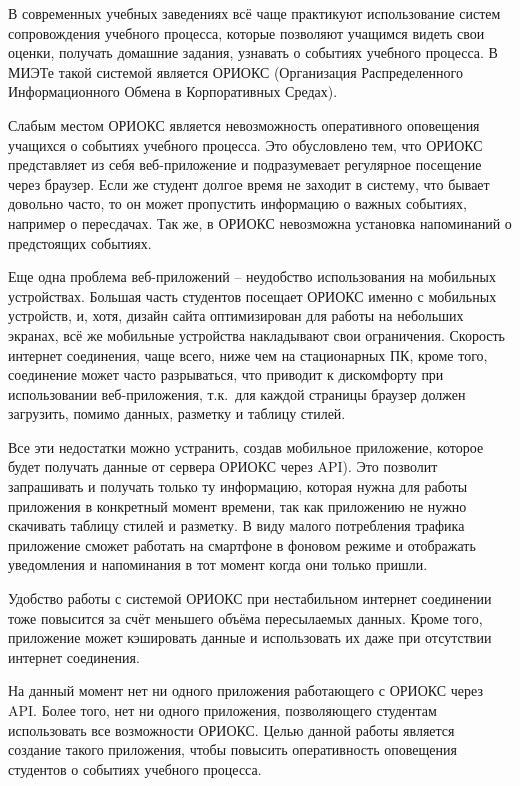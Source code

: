 \Introduction
{}
В современных учебных заведениях всё чаще практикуют использование систем сопровождения учебного процесса, которые позволяют учащимся видеть свои оценки, получать домашние задания, узнавать о событиях учебного процесса.
В МИЭТе такой системой является ОРИОКС (Организация Распределенного Информационного Обмена в Корпоративных Средах).

Слабым местом ОРИОКС является невозможность оперативного оповещения учащихся о событиях учебного процесса.
Это обусловлено тем, что ОРИОКС представляет из себя веб-приложение и подразумевает регулярное посещение через браузер.
Если же студент долгое время не заходит в систему, что бывает довольно часто, то он может пропустить информацию о важных событиях, например о пересдачах.
Так же, в ОРИОКС невозможна установка напоминаний о предстоящих событиях.

Еще одна проблема веб-приложений – неудобство использования на мобильных
устройствах.
Большая часть студентов посещает ОРИОКС именно с мобильных
устройств, и, хотя, дизайн сайта оптимизирован для работы на небольших экранах, всё же мобильные устройства накладывают свои ограничения.
Скорость интернет соединения, чаще всего, ниже чем на стационарных ПК, кроме того, соединение может часто разрываться, что приводит к дискомфорту
при использовании веб-приложения, т.к.\ для каждой страницы браузер должен
загрузить, помимо данных, разметку и таблицу стилей.


Все эти недостатки можно устранить, создав мобильное приложение, которое будет получать данные от сервера ОРИОКС через API).
Это позволит запрашивать и получать только ту информацию, которая нужна для работы приложения в конкретный момент времени, так как приложению не нужно скачивать таблицу стилей и разметку.
В виду малого потребления трафика приложение сможет работать на смартфоне в фоновом режиме и отображать уведомления и напоминания в тот момент когда они только пришли.

Удобство работы с системой ОРИОКС при нестабильном интернет соединении тоже повысится за счёт меньшего объёма пересылаемых данных.
Кроме того, приложение может кэшировать данные и использовать их даже при отсутствии интернет соединения.

На данный момент нет ни одного приложения работающего с ОРИОКС через API\@.
Более того, нет ни одного приложения, позволяющего студентам использовать все возможности ОРИОКС\@.
Целью данной работы является создание такого приложения, чтобы повысить оперативность оповещения студентов о событиях учебного процесса.
